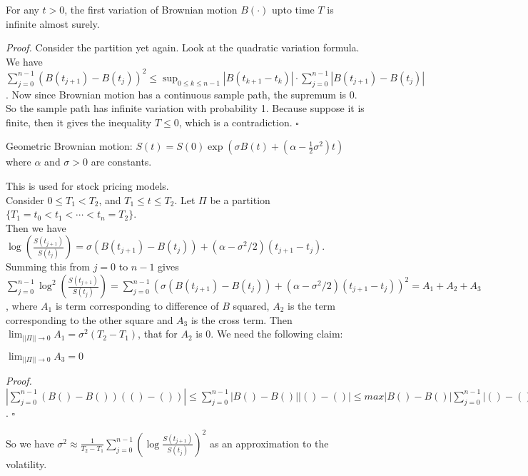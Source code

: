 \documentclass[a4paper]{article}
\newenvironment{proof}{\begin{breakbox}\textit{Proof.}}{\hfill$\square$\end{breakbox}}
\newcommand{\nl}{\vspace{0.2cm}\\}
\begin{document}
\begin{lemma}
    For any $t > 0$, the first variation of Brownian motion $B(\cdot)$ upto time $T$ is infinite almost surely.
\end{lemma}
\begin{proof}
    Consider the partition yet again. Look at the quadratic variation formula. We have $\sum_{j=0}^{n-1} (B(t_{j+1}) - B(t_j))^2 \le \sup_{0 \le k \le n - 1}|B(t_{k+1} - t_{k}
)| \cdot \sum_{j=0}^{n-1} |B(t_{j+1}) - B(t_j)|$. Now since Brownian motion has a continuous sample path, the supremum is $0$. So the sample path has infinite variation with probability 1.
Because suppose it is finite, then it gives the inequality $T \le 0$, which is a contradiction.
\end{proof}

\begin{defn}
Geometric Brownian motion:
$S(t) = S(0) \exp(\sigma B(t) + (\alpha - \frac{1}{2}\sigma^2) t)$ where $\alpha$ and $\sigma > 0$ are constants.
\end{defn}
This is used for stock pricing models.\nl
Consider $0 \le T_1 < T_2$, and $T_1 \le t \le T_2$. Let $\Pi$ be a partition $\{T_1 = t_0 < t_1 < \cdots < t_n = T_2\}$.\nl
Then we have $\log\left(\frac{S(t_{j+1})}{S(t_j)}\right) =
\sigma (B(t_{j+1}) - B(t_j)) + (\alpha - \sigma^2/2) (t_{j+1} - t_j)$.\nl
Summing this from $j = 0$ to $n - 1$ gives
$\sum_{j=0}^{n-1} \log^2\left(\frac{S(t_{j+1})}{S(t_j)}\right) = \sum_{j=0}^{n-1}
(\sigma (B(t_{j+1}) - B(t_j)) + (\alpha - \sigma^2/2) (t_{j+1} - t_j))^2 = A_1 + A_2 + A_3$, where $A_1$ is term corresponding to difference of $B$ squared, $A_2$ is the term corresponding to the
other square and $A_3$ is the cross term. Then $\lim_{||\Pi|| \to 0} A_1 = \sigma^2(T_2 - T_1)$, that for $A_2$ is $0$. We need the following claim:
\begin{claim}
$\lim_{||\Pi|| \to 0} A_3 = 0$
\end{claim}
\begin{proof}
    $|\sum_{j=0}^{n-1} (B() - B()) (() - ())| \le \sum_{j=0}^{n-1}|B() - B()||() - ()| \le max |B() - B()| \sum_{j=0}^{n-1}|() - ()| = 0 \cdot (T_2 - T_1)$. 
\end{proof}

So we have $\sigma^2 \approx \frac{1}{T_2 - T_1} \sum_{j=0}^{n-1} \left(\log \frac{S(t_{j+1})}{S(t_j)}\right)^2$ as an approximation to the volatility.\nl

\end{document}
